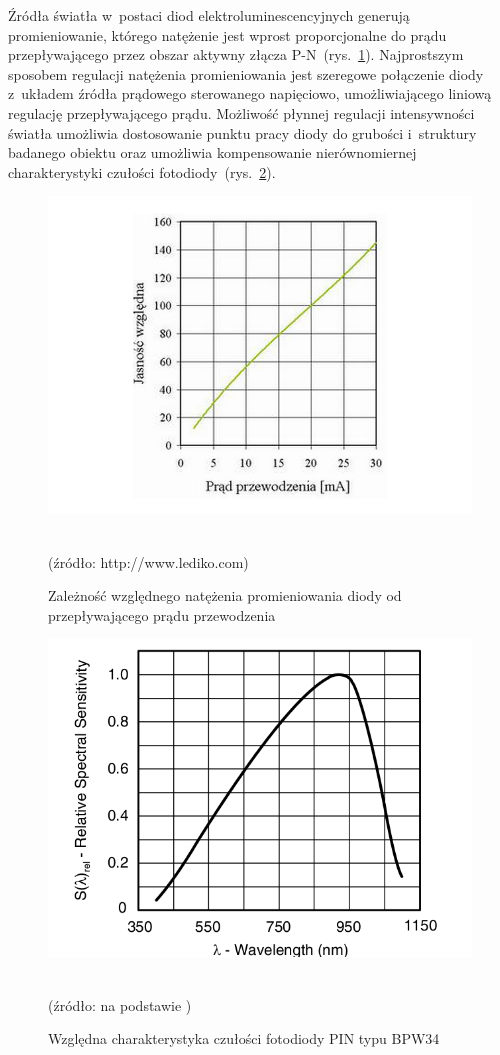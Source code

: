 Źródła światła w~postaci diod elektroluminescencyjnych generują promieniowanie, którego natężenie jest wprost proporcjonalne do prądu przepływającego przez obszar aktywny złącza P-N~(rys.~\ref{rys:LED}).
Najprostszym sposobem regulacji natężenia promieniowania jest szeregowe połączenie diody z~układem źródła prądowego sterowanego napięciowo, umożliwiającego liniową regulację przepływającego prądu. Możliwość 
płynnej regulacji intensywności światła umożliwia dostosowanie punktu pracy diody do grubości i~struktury badanego obiektu oraz umożliwia kompensowanie nierównomiernej charakterystyki czułości fotodiody~(rys.~\ref{rys:BPW34}).
\begin{figure}[!ht]
	\centerline{\includegraphics[scale = 0.46]{graphic/LED}}
	\caption{Zależność względnego natężenia promieniowania diody od przepływającego prądu przewodzenia}
	~\\
	(źródło: http://www.lediko.com)
	\label{rys:LED}
\end{figure}

\begin{figure}[!ht]
	\centerline{\includegraphics[scale = 0.46]{graphic/BPW34}}
	\caption{Względna charakterystyka czułości fotodiody PIN typu BPW34}
	~\\
	(źródło: na podstawie \cite{BPW34})
	\label{rys:BPW34}
\end{figure}

